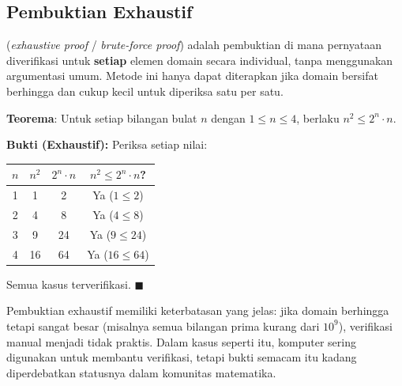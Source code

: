 \subsection{Pembuktian Exhaustif}

\begin{definisi}
 (\textit{exhaustive proof} / \textit{brute-force proof}) adalah pembuktian di mana pernyataan diverifikasi untuk \textbf{setiap} elemen domain secara individual, tanpa menggunakan argumentasi umum. Metode ini hanya dapat diterapkan jika domain bersifat berhingga dan cukup kecil untuk diperiksa satu per satu.
\end{definisi}

\begin{contoh}
\textbf{Teorema}: Untuk setiap bilangan bulat $n$ dengan $1 \leq n \leq 4$, berlaku $n^2 \leq 2^n \cdot n$.

\textbf{Bukti (Exhaustif):} Periksa setiap nilai:
\begin{center}
\renewcommand{\arraystretch}{1.2}
\begin{tabular}{|c|c|c|c|}
\hline
$n$ & $n^2$ & $2^n \cdot n$ & $n^2 \leq 2^n \cdot n$? \\ \hline
1 & 1 & 2 & Ya ($1 \leq 2$) \\ \hline
2 & 4 & 8 & Ya ($4 \leq 8$) \\ \hline
3 & 9 & 24 & Ya ($9 \leq 24$) \\ \hline
4 & 16 & 64 & Ya ($16 \leq 64$) \\ \hline
\end{tabular}
\end{center}

Semua kasus terverifikasi. $\blacksquare$
\end{contoh}

\begin{catatan}
Pembuktian exhaustif memiliki keterbatasan yang jelas: jika domain berhingga tetapi sangat besar (misalnya semua bilangan prima kurang dari $10^9$), verifikasi manual menjadi tidak praktis. Dalam kasus seperti itu, komputer sering digunakan untuk membantu verifikasi, tetapi bukti semacam itu kadang diperdebatkan statusnya dalam komunitas matematika.
\end{catatan}
